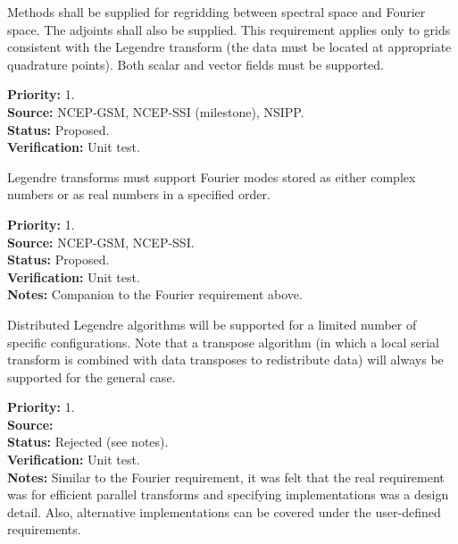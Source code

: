 
Methods shall be supplied for regridding between spectral space and
Fourier space.  The adjoints shall also be supplied.  This requirement
applies only to grids consistent with the Legendre transform (the
data must be located at appropriate quadrature points).
Both scalar and vector fields must be supported.

\begin{reqlist}
{\bf Priority:} 1. \\
{\bf Source:}  NCEP-GSM, NCEP-SSI (milestone), NSIPP. \\
{\bf Status:} Proposed. \\
{\bf Verification:} Unit test. 
\end{reqlist}


Legendre transforms must support Fourier modes stored as either
complex numbers or as real numbers in a specified order.

\begin{reqlist}
{\bf Priority:} 1. \\
{\bf Source:}  NCEP-GSM, NCEP-SSI. \\
{\bf Status:} Proposed. \\
{\bf Verification:} Unit test. \\
{\bf Notes:}  Companion to the Fourier requirement above.
\end{reqlist}


Distributed Legendre algorithms will be supported for a limited
number of specific configurations.  Note that a transpose
algorithm (in which a local serial transform is combined
with data transposes to redistribute data) will always
be supported for the general case.

\begin{reqlist}
{\bf Priority:} 1. \\
{\bf Source:}  \\
{\bf Status:} Rejected (see notes). \\
{\bf Verification:} Unit test. \\
{\bf Notes:} Similar to the Fourier requirement,
             it was felt that the real requirement was for
             efficient parallel transforms and specifying
             implementations was a design detail.  Also, alternative
             implementations can be covered under the user-defined
             requirements.
\end{reqlist}

